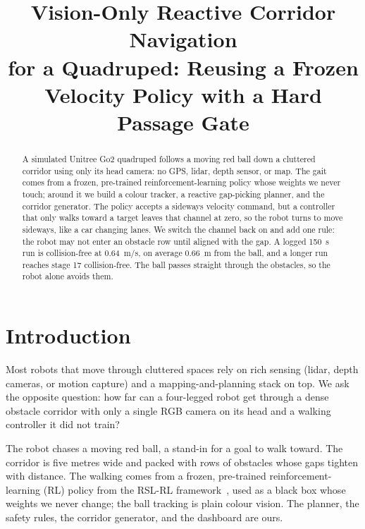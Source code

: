 \documentclass[conference]{IEEEtran}
\begin{document}
\title{Vision-Only Reactive Corridor Navigation\\
for a Quadruped: Reusing a Frozen\\
Velocity Policy with a Hard Passage Gate}

\author{
}

\maketitle

\begin{abstract}
A simulated Unitree Go2 quadruped follows a moving red ball down a cluttered corridor
using only its head camera: no GPS, lidar, depth sensor, or map. The gait comes
from a frozen, pre-trained reinforcement-learning policy whose weights we never touch;
around it we build a colour tracker, a reactive gap-picking planner, and the corridor
generator. The policy accepts a sideways velocity command, but a controller that only
walks toward a target leaves that channel at zero, so the robot turns to move sideways,
like a car changing lanes. We switch the channel back on and add one rule: the robot may
not enter an obstacle row until aligned with the gap. A logged 150~s run is collision-free
at 0.64~m/s, on average 0.66~m from the ball, and a longer run reaches stage 17
collision-free. The ball passes straight through the obstacles, so the robot alone avoids
them.
\end{abstract}

\section{Introduction}
Most robots that move through cluttered spaces rely on rich sensing (lidar, depth
cameras, or motion capture) and a mapping-and-planning stack on top. We ask the opposite
question: how far can a four-legged robot get through a dense obstacle corridor with only
a single RGB camera on its head and a walking controller it did not train?

The robot chases a moving red ball, a stand-in for a goal to walk toward. The corridor is
five metres wide and packed with rows of obstacles whose gaps tighten with distance. The
walking comes from a frozen, pre-trained reinforcement-learning (RL) policy from the
RSL-RL framework~\cite{rudin}, used as a black box whose weights we never change; the ball
tracking is plain colour vision. The planner, the safety rules, the corridor generator,
and the dashboard are ours.
\end{document}
